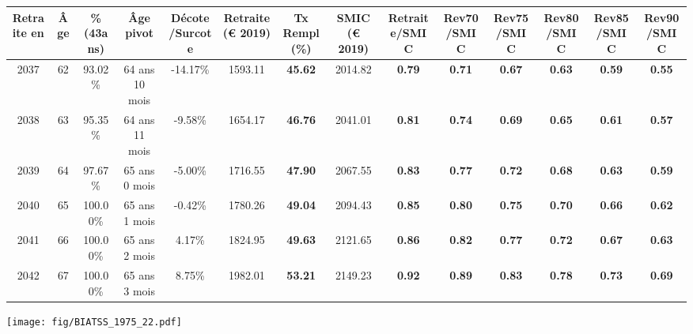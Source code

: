 \begin{adjustbox}{max width=\textwidth} 
\begin{tabular}[htb]{|c|c||c|c|c||c|c||c||c|c|c|c|c|c|} 
\hline 
 Retraite en &  Âge &  \%(43ans) &  Âge pivot &  Décote/Surcote &  Retraite (\euro{} 2019) &  Tx Rempl(\%) &  SMIC (\euro{} 2019) &  Retraite/SMIC &  Rev70/SMIC &  Rev75/SMIC &  Rev80/SMIC &  Rev85/SMIC &  Rev90/SMIC \\ 
\hline \hline 
 2037 &  62 &  93.02\% &  64 ans 10 mois &  -14.17\% &  1593.11 &  {\bf 45.62} &  2014.82 &  {\bf {\color{red} 0.79}} &  {\bf {\color{red} 0.71}} &  {\bf {\color{red} 0.67}} &  {\bf {\color{red} 0.63}} &  {\bf {\color{red} 0.59}} &  {\bf {\color{red} 0.55}} \\ 
\hline 
 2038 &  63 &  95.35\% &  64 ans 11 mois &  -9.58\% &  1654.17 &  {\bf 46.76} &  2041.01 &  {\bf {\color{red} 0.81}} &  {\bf {\color{red} 0.74}} &  {\bf {\color{red} 0.69}} &  {\bf {\color{red} 0.65}} &  {\bf {\color{red} 0.61}} &  {\bf {\color{red} 0.57}} \\ 
\hline 
 2039 &  64 &  97.67\% &  65 ans 0 mois &  -5.00\% &  1716.55 &  {\bf 47.90} &  2067.55 &  {\bf {\color{red} 0.83}} &  {\bf {\color{red} 0.77}} &  {\bf {\color{red} 0.72}} &  {\bf {\color{red} 0.68}} &  {\bf {\color{red} 0.63}} &  {\bf {\color{red} 0.59}} \\ 
\hline 
 2040 &  65 &  100.00\% &  65 ans 1 mois &  -0.42\% &  1780.26 &  {\bf 49.04} &  2094.43 &  {\bf {\color{red} 0.85}} &  {\bf {\color{red} 0.80}} &  {\bf {\color{red} 0.75}} &  {\bf {\color{red} 0.70}} &  {\bf {\color{red} 0.66}} &  {\bf {\color{red} 0.62}} \\ 
\hline 
 2041 &  66 &  100.00\% &  65 ans 2 mois &  4.17\% &  1824.95 &  {\bf 49.63} &  2121.65 &  {\bf {\color{red} 0.86}} &  {\bf {\color{red} 0.82}} &  {\bf {\color{red} 0.77}} &  {\bf {\color{red} 0.72}} &  {\bf {\color{red} 0.67}} &  {\bf {\color{red} 0.63}} \\ 
\hline 
 2042 &  67 &  100.00\% &  65 ans 3 mois &  8.75\% &  1982.01 &  {\bf 53.21} &  2149.23 &  {\bf {\color{red} 0.92}} &  {\bf {\color{red} 0.89}} &  {\bf {\color{red} 0.83}} &  {\bf {\color{red} 0.78}} &  {\bf {\color{red} 0.73}} &  {\bf {\color{red} 0.69}} \\ 
\hline 
\hline 
\end{tabular} 
\end{adjustbox} 
 
 \vspace{0.1cm} 

 \begin{center}\texttt{[image: fig/BIATSS\_1975\_22.pdf]}\end{center} \label{fig/BIATSS_1975_22.pdf} 

